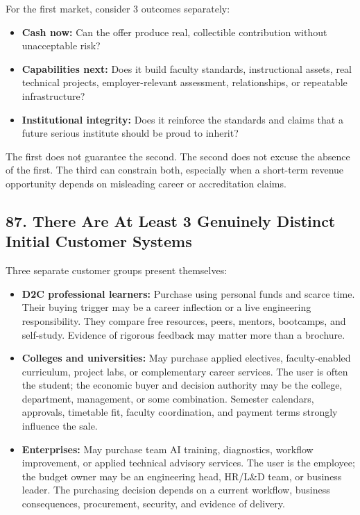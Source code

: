 For the first market, consider 3 outcomes separately:

\begin{itemize}
    \item \textbf{Cash now:} Can the offer produce real, collectible contribution without unacceptable risk?
    \item \textbf{Capabilities next:} Does it build faculty standards, instructional assets, real technical projects, employer-relevant assessment, relationships, or repeatable infrastructure?
    \item \textbf{Institutional integrity:} Does it reinforce the standards and claims that a future serious institute should be proud to inherit?
\end{itemize}

The first does not guarantee the second. The second does not excuse the absence of the first. The third can constrain both, especially when a short-term revenue opportunity depends on misleading career or accreditation claims.

\subsection*{87. There Are At Least 3 Genuinely Distinct Initial Customer Systems}

Three separate customer groups present themselves:

\begin{itemize}
    \item \textbf{D2C professional learners:} Purchase using personal funds and scarce time. Their buying trigger may be a career inflection or a live engineering responsibility. They compare free resources, peers, mentors, bootcamps, and self-study. Evidence of rigorous feedback may matter more than a brochure.
    \item \textbf{Colleges and universities:} May purchase applied electives, faculty-enabled curriculum, project labs, or complementary career services. The user is often the student; the economic buyer and decision authority may be the college, department, management, or some combination. Semester calendars, approvals, timetable fit, faculty coordination, and payment terms strongly influence the sale.
    \item \textbf{Enterprises:} May purchase team AI training, diagnostics, workflow improvement, or applied technical advisory services. The user is the employee; the budget owner may be an engineering head, HR/L\&D team, or business leader. The purchasing decision depends on a current workflow, business consequences, procurement, security, and evidence of delivery.
\end{itemize}

